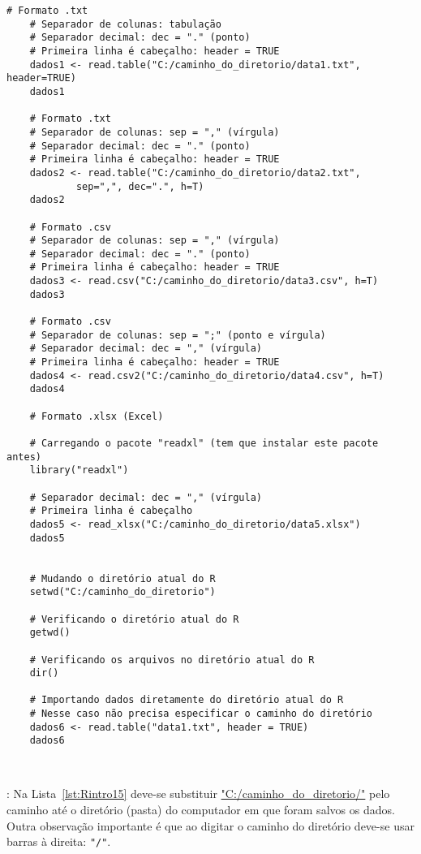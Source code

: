 \documentclass[11pt,fleqn]{book} %
\begin{document}
\begin{scriptsize}
	\estiloR
	\begin{lstlisting}[caption={Comandos do software R}, label=lst:Rintro15]
	# Formato .txt
	# Separador de colunas: tabulação
	# Separador decimal: dec = "." (ponto)
	# Primeira linha é cabeçalho: header = TRUE
	dados1 <- read.table("C:/caminho_do_diretorio/data1.txt", header=TRUE)
	dados1

	# Formato .txt
	# Separador de colunas: sep = "," (vírgula)
	# Separador decimal: dec = "." (ponto)
	# Primeira linha é cabeçalho: header = TRUE
	dados2 <- read.table("C:/caminho_do_diretorio/data2.txt", 
			sep=",", dec=".", h=T)
	dados2
	
	# Formato .csv
	# Separador de colunas: sep = "," (vírgula)
	# Separador decimal: dec = "." (ponto)
	# Primeira linha é cabeçalho: header = TRUE
	dados3 <- read.csv("C:/caminho_do_diretorio/data3.csv", h=T)
	dados3

	# Formato .csv
	# Separador de colunas: sep = ";" (ponto e vírgula)
	# Separador decimal: dec = "," (vírgula)
	# Primeira linha é cabeçalho: header = TRUE
	dados4 <- read.csv2("C:/caminho_do_diretorio/data4.csv", h=T)
	dados4

	# Formato .xlsx (Excel)

	# Carregando o pacote "readxl" (tem que instalar este pacote antes)
	library("readxl")	
	
	# Separador decimal: dec = "," (vírgula)
	# Primeira linha é cabeçalho
	dados5 <- read_xlsx("C:/caminho_do_diretorio/data5.xlsx")
	dados5
	
	
	# Mudando o diretório atual do R
	setwd("C:/caminho_do_diretorio")
	
	# Verificando o diretório atual do R
	getwd()
	
	# Verificando os arquivos no diretório atual do R
	dir()

	# Importando dados diretamente do diretório atual do R
	# Nesse caso não precisa especificar o caminho do diretório
	dados6 <- read.table("data1.txt", header = TRUE)
	dados6
	
		
	\end{lstlisting}
\end{scriptsize}


: Na Lista~\ref{lst:Rintro15} deve-se substituir \url{"C:/caminho_do_diretorio/"} pelo caminho até o diretório (pasta) do computador em que foram salvos os dados. Outra observação importante é que ao digitar o caminho do diretório deve-se usar barras à direita: \texttt{"/"}.
\end{document}
